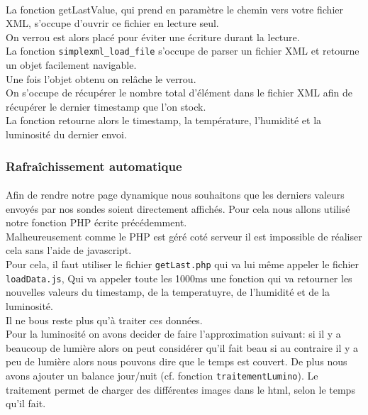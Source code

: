 \documentclass[a4paper, titlepage, oneside, 12pt]{article}%
\begin{document}
\paragraph{}
La fonction getLastValue, qui prend en paramètre le chemin vers votre fichier XML, s'occupe d'ouvrir ce fichier en lecture seul.\\
On verrou est alors placé pour éviter une écriture durant la lecture.\\
La fonction \texttt{simplexml\_load\_file} s'occupe de parser un fichier XML et retourne un objet facilement navigable.\\
Une fois l'objet obtenu on relâche le verrou. \\
On s'occupe de récupérer le nombre total d’élément dans le fichier XML afin de récupérer le dernier timestamp que l'on stock.\\
La fonction retourne alors le timestamp, la température, l'humidité et la luminosité du dernier envoi.\\

\subsubsection{Rafraîchissement automatique}
\paragraph{}
Afin de rendre notre page dynamique nous souhaitons que les derniers valeurs envoyés par nos sondes soient directement affichés. Pour cela nous allons utilisé notre fonction PHP écrite précédemment.\\
Malheureusement comme le PHP est géré coté serveur il est impossible de réaliser cela sans l'aide de javascript.\\
Pour cela, il faut utiliser le fichier \texttt{getLast.php} qui va lui même appeler le fichier \texttt{loadData.js}, Qui va appeler toute les 1000ms une fonction qui va retourner les nouvelles valeurs du timestamp, de la temperatuyre, de l'humidité et de la luminosité.\\
Il ne bous reste plus qu'à traiter ces données.\\
Pour la luminosité on avons decider de faire l'approximation suivant: si il y a beaucoup de lumière alors on peut considérer qu'il fait beau si au contraire il y a peu de lumière alors nous pouvons dire que le temps est couvert. De plus nous avons ajouter un balance jour/nuit (cf. fonction \texttt{traitementLumino}).
Le traitement permet de charger des différentes images dans le html, selon le temps qu'il fait.
\end{document}
